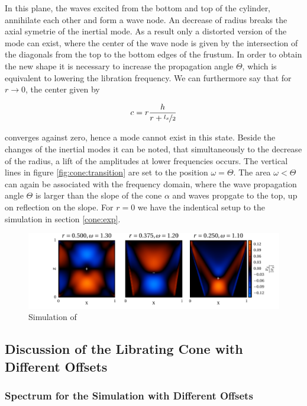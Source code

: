 In this plane, the waves excited from the bottom and top of the cylinder, annihilate each other and form a wave node.
An decrease of radius breaks the axial symetrie of the inertial mode.
As a result only a distorted version of the mode can exist, where the center of the wave node
is given by the intersection of the diagonals from the top to the bottom edges of the frustum.
In order to obtain the new shape it is necessary to increase the propagation angle $\Theta$,
which is equivalent to lowering the libration frequency.
We can furthermore say that for $r \rightarrow 0$, the center given by

\begin{align}
c  = r \frac{h}{r+\nicefrac{l_x}{2}}
\end{align}

converges against zero, hence a mode cannot exist in this state.
Beside the changes of the inertial modes it can be noted, that simultaneously to the decrease of the radius,
a lift of the amplitudes at lower frequencies occurs.
The vertical lines in figure \ref{fig:cone:transition} are set to the position $\omega=\Theta$.
The area $\omega<\Theta$ can again be associated with the frequency domain, where the wave propagation angle $\Theta$ is larger than
the  slope of the cone $\alpha$ and waves propgate to the top, up on reflection on the slope.
For $r=0$ we have the indentical setup to the simulation in section \ref{cone:exp}.

\begin{figure}[!pt]
  \centering
  \includegraphics{gfx/cone/transition/phase.pdf}
  \caption{\label{fig:cone:phase}
    Simulation of
  }
\end{figure}

\subsection{Discussion of the Librating Cone with Different Offsets}


\subsubsection{Spectrum for the Simulation with Different Offsets}

